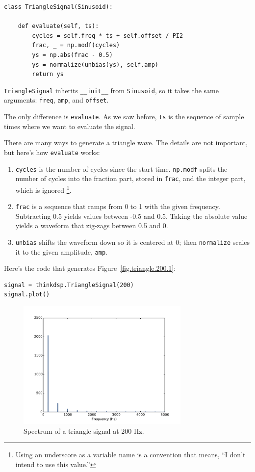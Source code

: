 \documentclass[12pt]{book}
\begin{document}
\begin{verbatim}
class TriangleSignal(Sinusoid):
    
    def evaluate(self, ts):
        cycles = self.freq * ts + self.offset / PI2
        frac, _ = np.modf(cycles)
        ys = np.abs(frac - 0.5)
        ys = normalize(unbias(ys), self.amp)
        return ys
\end{verbatim}

{\tt TriangleSignal} inherits \verb"__init__" from {\tt Sinusoid},
so it takes the same arguments: {\tt freq}, {\tt amp}, and {\tt offset}.

The only difference is {\tt evaluate}.  As we saw before,
{\tt ts} is the sequence of sample times where we want to
evaluate the signal.

There are many ways to generate a triangle wave.  The details
are not important, but here's how {\tt evaluate} works:

\begin{enumerate}

\item {\tt cycles} is the number of cycles since the start time.
{\tt np.modf} splits the number of cycles into the fraction
part, stored in {\tt frac}, and the integer part, which is ignored
\footnote{Using an underscore as a variable name is a convention that
means, ``I don't intend to use this value.''}.

\item {\tt frac} is a sequence that ramps from 0 to 1 with the given
  frequency.  Subtracting 0.5 yields values between -0.5 and 0.5.
  Taking the absolute value yields a waveform that zig-zags between
  0.5 and 0.

\item {\tt unbias} shifts the waveform down so it is centered at 0; then
{\tt normalize} scales it to the given amplitude, {\tt amp}.

\end{enumerate}

Here's the code that generates Figure~\ref{fig.triangle.200.1}:

\begin{verbatim}
signal = thinkdsp.TriangleSignal(200)
signal.plot()
\end{verbatim}

\begin{figure}
\centerline{\includegraphics[height=2.5in]{figs/triangle-200-2.pdf}}
\caption{Spectrum of a triangle signal at 200 Hz.}
\label{fig.triangle.200.2}
\end{figure}
\end{document}
